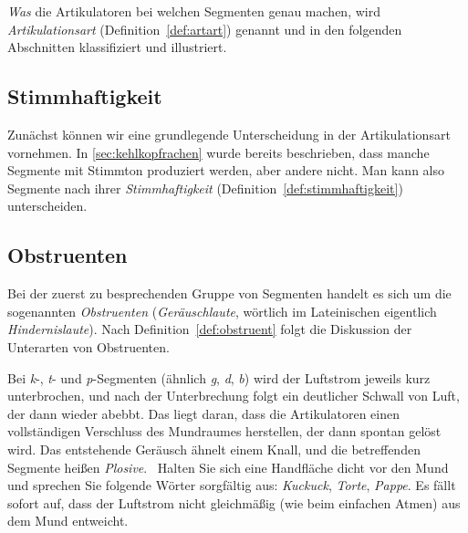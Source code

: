 \textit{Was} die Artikulatoren bei welchen Segmenten genau machen, wird \textit{Artikulationsart} (Definition~\ref{def:artart}) genannt und in den folgenden Abschnitten klassifiziert und illustriert.


\subsection{Stimmhaftigkeit}

\label{sec:stimmhaftigkeit}

Zunächst können wir eine grundlegende Unterscheidung in der Artikulationsart vornehmen.
In \ref{sec:kehlkopfrachen} wurde bereits beschrieben, dass manche Segmente mit Stimmton produziert werden, aber andere nicht.
Man kann also Segmente nach ihrer \textit{Stimmhaftigkeit} (Definition~\ref{def:stimmhaftigkeit}) unterscheiden.


\subsection{Obstruenten}

\label{sec:obstruenten}

Bei der zuerst zu besprechenden Gruppe von Segmenten handelt es sich um die sogenannten \textit{Obstruenten} (\textit{Geräuschlaute}, wörtlich im Lateinischen eigentlich \textit{Hindernislaute}).
Nach Definition~\ref{def:obstruent} folgt die Diskussion der Unterarten von Obstruenten.


Bei \textit{k}-, \textit{t}- und \textit{p}-Segmenten (ähnlich \textit{g}, \textit{d}, \textit{b}) wird der Luftstrom jeweils kurz unterbrochen, und nach der Unterbrechung folgt ein deutlicher Schwall von Luft, der dann wieder abebbt.
Das liegt daran, dass die Artikulatoren einen vollständigen Verschluss des Mundraumes herstellen, der dann spontan gelöst wird.
Das entstehende Geräusch ähnelt einem Knall, und die betreffenden Segmente heißen \textit{Plosive}.
\TuBegin~Halten Sie sich eine Handfläche dicht vor den Mund und sprechen Sie folgende Wörter sorgfältig aus: \textit{Kuckuck}, \textit{Torte}, \textit{Pappe}.
Es fällt sofort auf, dass der Luftstrom nicht gleichmäßig (wie beim einfachen Atmen) aus dem Mund entweicht.

